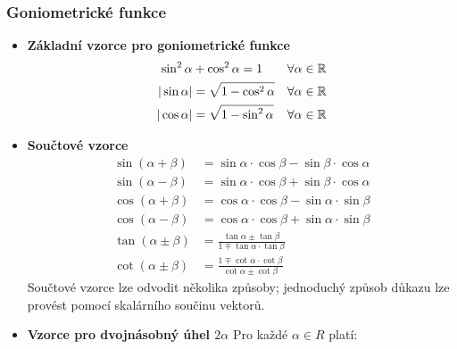       \subsubsection{Goniometrické funkce}
      
        \begin{itemize}
          \item \textbf{Základní vzorce pro goniometrické funkce}
            \begin{align}
              \sin^2\alpha &+ \cos^2\alpha = 1      &\forall\alpha\in\mathbb{R} \label{MA1:eq_sincos} \\ 
              |\sin\alpha| &= \sqrt{1-\cos^2\alpha} &\forall\alpha\in\mathbb{R} \label{MA1:eq_sinabs} \\ 
              |\cos\alpha| &= \sqrt{1-\sin^2\alpha} &\forall\alpha\in\mathbb{R} \label{MA1:eq_cosabs}
            \end{align}  
          \item \textbf{Součtové vzorce}
            \begin{align}
              \sin(\alpha + \beta) 
                &= \sin\alpha\cdot\cos\beta - \sin\beta\cdot\cos\alpha           \label{MA1:eq_sinxpy}  \\ 
              \sin(\alpha - \beta) 
                &= \sin\alpha\cdot\cos\beta + \sin\beta\cdot\cos\alpha           \label{MA1:eq_sinxmy}  \\ 
              \cos(\alpha + \beta) 
                &= \cos\alpha\cdot\cos\beta - \sin\alpha\cdot\sin\beta           \label{MA1:eq_cosxpy}  \\ 
              \cos(\alpha - \beta) 
                &= \cos\alpha\cdot\cos\beta + \sin\alpha\cdot\sin\beta           \label{MA1:eq_cosxmy}  \\ 
              \tan(\alpha\pm\beta) 
                &= \frac{\tan\alpha\pm\tan\beta}{1\mp\tan\alpha\cdot\tan\beta}   \label{MA1:eq_tanxpmy} \\ 
              \cot(\alpha\pm\beta) 
                &= \frac{1\mp\cot\alpha\cdot\cot\beta}{\cot\alpha\pm \cot\beta}  \label{MA1:eq_cotxpmy}
            \end{align}
            Součtové vzorce lze odvodit několika způsoby; jednoduchý způsob důkazu lze provést pomocí skalárního součinu vektorů.
          \item \textbf{Vzorce pro dvojnásobný úhel $2\alpha$}
            \newline Pro každé $\alpha\in R$ platí:

\end{itemize}
